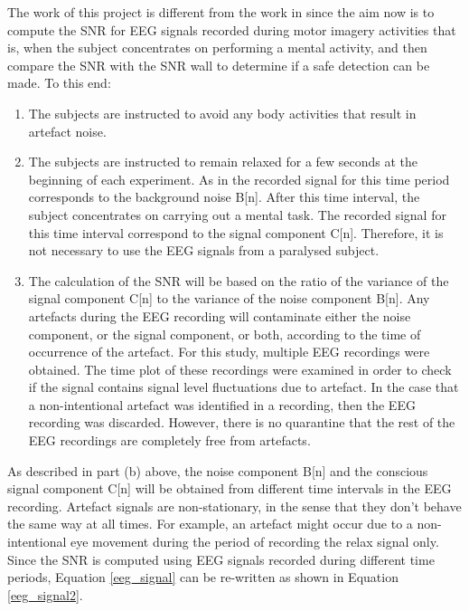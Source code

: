 The work of this project is different from the work in \citep{Porr2018}  since the aim now is to compute the SNR for EEG signals recorded during motor imagery activities that is, when the subject concentrates on performing a mental activity, and then compare the SNR with the SNR wall to determine if a safe detection can be made.   To this end:
\begin{enumerate} [label=\alph*)]

	\item The subjects are instructed to avoid any body activities that result in artefact noise. 
	\item The subjects are instructed to remain relaxed for a few seconds at the beginning of each experiment. As in \citep{Porr2018} the recorded signal for this time period corresponds to the background noise B[n]. After this time interval, the subject concentrates on carrying out a mental task. The recorded signal for this time interval correspond to the signal component C[n]. Therefore, it is not necessary to use the EEG signals from a paralysed subject.
	\item The calculation of the SNR will be based on the ratio of the variance of the signal component C[n] to the variance of the noise component B[n]. Any artefacts during the EEG recording will contaminate either the noise component, or the signal component, or both, according to the time of occurrence of the artefact. For this study, multiple EEG recordings were obtained. The time plot of these recordings were examined in order to check if the signal contains signal level fluctuations due to artefact. In the case that a non-intentional artefact was identified in a recording, then the EEG recording was discarded. However, there is no quarantine that the rest of the EEG recordings are completely free from artefacts.

\end{enumerate} 

As described in part (b) above, the noise component B[n] and the conscious signal component C[n] will be obtained from different time intervals in the EEG recording. Artefact signals are non-stationary, in the sense that they don’t behave the same way at all times. For example, an artefact might occur due to a non-intentional eye movement during the period of recording the relax signal only. Since the SNR is computed using EEG signals recorded during different time periods, Equation \ref{eeg_signal} can be re-written as shown in Equation  \ref{eeg_signal2}. 



